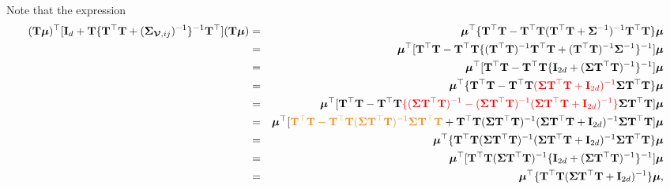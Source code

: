 \documentclass[12pt]{article}
\newcommand{\0}{\mathbf{0}}
\begin{document}
Note that the expression
\begin{eqnarray*}
( \mathbf{T} \boldsymbol{\mu} )^{\top} [ \mathbf{I}_d + \mathbf{T} \{ \mathbf{T}^{\top} \mathbf{T} + ( \boldsymbol{\Sigma}_{\boldsymbol{\mathcal{V}}, ij})^{-1} \}^{-1} \mathbf{T}^{\top} ] ( \mathbf{T}  \boldsymbol{\mu} )
 & = & \boldsymbol{\mu}^{\top} \{ \mathbf{T}^{\top} \mathbf{T} - \mathbf{T}^{\top} \mathbf{T} ( \mathbf{T}^{\top} \mathbf{T} + \boldsymbol{\Sigma}^{-1} )^{-1} \mathbf{T}^{\top} \mathbf{T} \}  \boldsymbol{\mu} \\
& = & \boldsymbol{\mu}^{\top} [ \mathbf{T}^{\top} \mathbf{T} - \mathbf{T}^{\top} \mathbf{T} \{ (\mathbf{T}^{\top} \mathbf{T})^{-1} \mathbf{T}^{\top} \mathbf{T} + (\mathbf{T}^{\top} \mathbf{T})^{-1} \boldsymbol{\Sigma}^{-1} \}^{-1} ]  \boldsymbol{\mu} \\
& = & \boldsymbol{\mu}^{\top} [ \mathbf{T}^{\top} \mathbf{T} - \mathbf{T}^{\top} \mathbf{T} \{ \mathbf{I}_{2 d} + (\boldsymbol{\Sigma} \mathbf{T}^{\top} \mathbf{T} )^{-1} \}^{-1} ] \boldsymbol{\mu} \\
& = & \boldsymbol{\mu}^{\top} \{ \mathbf{T}^{\top} \mathbf{T} - \mathbf{T}^{\top} \mathbf{T} \textcolor{red}{( \boldsymbol{\Sigma} \mathbf{T}^{\top} \mathbf{T} + \mathbf{I}_{2 d} )^{-1}} \boldsymbol{\Sigma} \mathbf{T}^{\top} \mathbf{T} \} \boldsymbol{\mu} \\
& = & \boldsymbol{\mu}^{\top} [ \mathbf{T}^{\top} \mathbf{T} - \mathbf{T}^{\top} \mathbf{T} \textcolor{red}{\{ (\boldsymbol{\Sigma} \mathbf{T}^{\top} \mathbf{T})^{-1} - (\boldsymbol{\Sigma} \mathbf{T}^{\top} \mathbf{T})^{-1} ( \boldsymbol{\Sigma} \mathbf{T}^{\top} \mathbf{T} + \mathbf{I}_{2 d} )^{-1} \}} \boldsymbol{\Sigma} \mathbf{T}^{\top} \mathbf{T} ] \boldsymbol{\mu} \\
& = & \boldsymbol{\mu}^{\top} [ \textcolor{kaustorange}{\mathbf{T}^{\top} \mathbf{T} - \mathbf{T}^{\top} \mathbf{T} (\boldsymbol{\Sigma} \mathbf{T}^{\top} \mathbf{T})^{-1} \boldsymbol{\Sigma} \mathbf{T}^{\top} \mathbf{T}} + \mathbf{T}^{\top} \mathbf{T} (\boldsymbol{\Sigma} \mathbf{T}^{\top} \mathbf{T})^{-1} ( \boldsymbol{\Sigma} \mathbf{T}^{\top} \mathbf{T} + \mathbf{I}_{2 d} )^{-1} \boldsymbol{\Sigma} \mathbf{T}^{\top} \mathbf{T} ] \boldsymbol{\mu} \\
& = & \boldsymbol{\mu}^{\top} \{ \mathbf{T}^{\top} \mathbf{T} (\boldsymbol{\Sigma} \mathbf{T}^{\top} \mathbf{T})^{-1} ( \boldsymbol{\Sigma} \mathbf{T}^{\top} \mathbf{T} + \mathbf{I}_{2 d} )^{-1} \boldsymbol{\Sigma} \mathbf{T}^{\top} \mathbf{T} \} \boldsymbol{\mu} \\
& = & \boldsymbol{\mu}^{\top} [ \mathbf{T}^{\top} \mathbf{T} (\boldsymbol{\Sigma} \mathbf{T}^{\top} \mathbf{T})^{-1} \{ \mathbf{I}_{2 d} + (\boldsymbol{\Sigma} \mathbf{T}^{\top} \mathbf{T})^{-1} \}^{-1} ] \boldsymbol{\mu} \\
& = & \boldsymbol{\mu}^{\top} \{ \mathbf{T}^{\top} \mathbf{T} ( \boldsymbol{\Sigma} \mathbf{T}^{\top} \mathbf{T} + \mathbf{I}_{2 d} )^{-1} \} \boldsymbol{\mu},
\end{eqnarray*}
\end{document}
